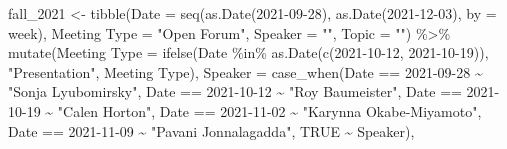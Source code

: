 \documentclass[]{tufte-handout}
\newenvironment{Shaded}{}{}
\newcommand{\AttributeTok}[1]{\textcolor[rgb]{0.49,0.56,0.16}{#1}}
\newcommand{\ConstantTok}[1]{\textcolor[rgb]{0.53,0.00,0.00}{#1}}
\newcommand{\FunctionTok}[1]{\textcolor[rgb]{0.02,0.16,0.49}{#1}}
\newcommand{\NormalTok}[1]{#1}
\newcommand{\OtherTok}[1]{\textcolor[rgb]{0.00,0.44,0.13}{#1}}
\newcommand{\SpecialCharTok}[1]{\textcolor[rgb]{0.25,0.44,0.63}{#1}}
\newcommand{\StringTok}[1]{\textcolor[rgb]{0.25,0.44,0.63}{#1}}
\begin{document}
\begin{Shaded}
\begin{Highlighting}[]
\NormalTok{fall\_2021 }\OtherTok{\textless{}{-}} 
  \FunctionTok{tibble}\NormalTok{(}\AttributeTok{Date =} \FunctionTok{seq}\NormalTok{(}\FunctionTok{as.Date}\NormalTok{(}\StringTok{\textquotesingle{}2021{-}09{-}28\textquotesingle{}}\NormalTok{),}
                    \FunctionTok{as.Date}\NormalTok{(}\StringTok{\textquotesingle{}2021{-}12{-}03\textquotesingle{}}\NormalTok{),}
                    \AttributeTok{by =} \StringTok{\textquotesingle{}week\textquotesingle{}}\NormalTok{),}
         \StringTok{\textasciigrave{}}\AttributeTok{Meeting Type}\StringTok{\textasciigrave{}} \OtherTok{=} \StringTok{"Open Forum"}\NormalTok{, }
         \AttributeTok{Speaker =} \StringTok{""}\NormalTok{, }\AttributeTok{Topic =} \StringTok{""}\NormalTok{) }\SpecialCharTok{\%\textgreater{}\%}
  \FunctionTok{mutate}\NormalTok{(}\StringTok{\textasciigrave{}}\AttributeTok{Meeting Type}\StringTok{\textasciigrave{}} \OtherTok{=} \FunctionTok{ifelse}\NormalTok{(Date }\SpecialCharTok{\%in\%} \FunctionTok{as.Date}\NormalTok{(}\FunctionTok{c}\NormalTok{(}\StringTok{\textquotesingle{}2021{-}10{-}12\textquotesingle{}}\NormalTok{, }\StringTok{\textquotesingle{}2021{-}10{-}19\textquotesingle{}}\NormalTok{)),}
                                 \StringTok{"Presentation"}\NormalTok{, }\StringTok{\textasciigrave{}}\AttributeTok{Meeting Type}\StringTok{\textasciigrave{}}\NormalTok{),}
         \AttributeTok{Speaker =} \FunctionTok{case\_when}\NormalTok{(Date }\SpecialCharTok{==} \StringTok{\textquotesingle{}2021{-}09{-}28\textquotesingle{}} \SpecialCharTok{\textasciitilde{}} \StringTok{"Sonja Lyubomirsky"}\NormalTok{,}
\NormalTok{                             Date }\SpecialCharTok{==} \StringTok{\textquotesingle{}2021{-}10{-}12\textquotesingle{}} \SpecialCharTok{\textasciitilde{}} \StringTok{"Roy Baumeister"}\NormalTok{,}
\NormalTok{                             Date }\SpecialCharTok{==} \StringTok{\textquotesingle{}2021{-}10{-}19\textquotesingle{}} \SpecialCharTok{\textasciitilde{}} \StringTok{"Calen Horton"}\NormalTok{,}
\NormalTok{                             Date }\SpecialCharTok{==} \StringTok{\textquotesingle{}2021{-}11{-}02\textquotesingle{}} \SpecialCharTok{\textasciitilde{}} \StringTok{"Karynna Okabe{-}Miyamoto"}\NormalTok{,}
\NormalTok{                             Date }\SpecialCharTok{==} \StringTok{\textquotesingle{}2021{-}11{-}09\textquotesingle{}} \SpecialCharTok{\textasciitilde{}} \StringTok{"Pavani Jonnalagadda"}\NormalTok{,}
                             \ConstantTok{TRUE} \SpecialCharTok{\textasciitilde{}}\NormalTok{ Speaker),}

\end{Highlighting}
\end{Shaded}
\end{document}
